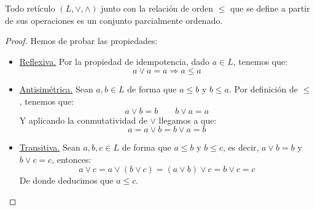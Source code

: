 \begin{prop}
    Todo retículo $(L,\lor,\land)$ junto con la relación de orden $\leq$ que se define a partir de sus operaciones es un conjunto parcialmente ordenado.
    \begin{proof}
        Hemos de probar las propiedades:
        \begin{itemize}
            \item \underline{Reflexiva.} Por la propiedad de idempotencia, dado $a\in L$, tenemos que:
                \begin{equation*}
                    a\lor a = a \Longrightarrow a\leq a
                \end{equation*}
            \item \underline{Antisimétrica.} Sean $a,b\in L$ de forma que $a\leq b$ y $b\leq a$. Por definición de $\leq$, tenemos que:
                \begin{equation*}
                    a\lor b = b \qquad b\lor a = a
                \end{equation*}
                Y aplicando la conmutatividad de $\lor$ llegamos a que:
                \begin{equation*}
                    a = a\lor b = b\lor a = b
                \end{equation*}
            \item \underline{Transitiva.} Sean $a,b,c\in L$ de forma que $a\leq b$ y $b\leq c$, es decir, $a\lor b = b$ y $b\lor c = c$, entonces:
                \begin{equation*}
                    a\lor c = a\lor (b\lor c) = (a\lor b)\lor c = b\lor c = c
                \end{equation*}
                De donde deducimos que $a\leq c$.
        \end{itemize}
    \end{proof}
\end{prop}


